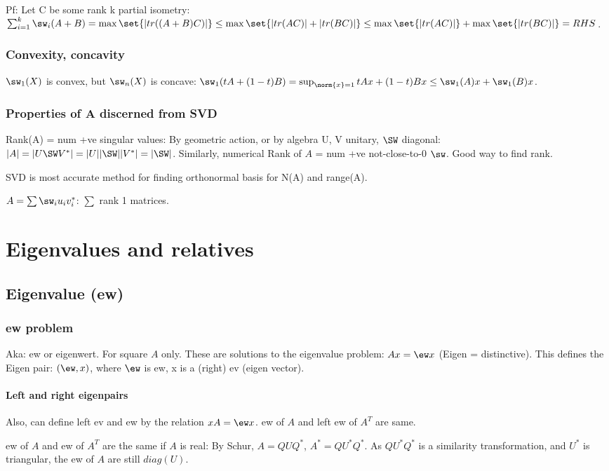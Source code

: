 \documentclass[oneside, article]{memoir}
\begin{document}
Pf: Let C be some rank k partial isometry:\\ $\sum_{i=1}^{k}\sw_{i}(A+B) = \max \set{|tr((A+B)C)|} \leq \max \set{|tr(AC)| + |tr(BC)|} \\
\leq \max \set{|tr(AC)|} + \max \set{|tr(BC)|} = RHS$.

\subsection{Convexity, concavity}
$\sw_1(X)$ is convex, but $\sw_n(X)$ is concave: $ \sw_1(tA + (1-t)B) = \sup_{\norm{x}=1} tAx + (1-t)Bx \leq \sw_1(A)x + \sw_1(B)x$.


\subsection{Properties of A discerned from SVD}
Rank(A) = num +ve singular values: By geometric action, or by algebra U, V unitary, $\SW$ diagonal: $|A|=|U\SW V^{*}|=|U||\SW| |V^{*}| =|\SW|$. Similarly, numerical Rank of $A$ = num +ve not-close-to-0 $\sw$. Good way to find rank.

SVD is most accurate method for finding orthonormal basis for N(A) and range(A).

$A=\sum \sw_{i}u_{i}v_{i}^{*}$: $\sum$ rank 1 matrices.

\chapter{Eigenvalues and relatives}
\section{Eigenvalue (ew)}
\subsection{ew problem}
Aka: ew or eigenwert. For square $A$ only. These are solutions to the eigenvalue problem: $Ax=\ew x$ (Eigen = distinctive). This defines the Eigen pair: $(\ew, x)$, where $\ew$ is ew, x is a (right) ev (eigen vector).

\subsubsection{Left and right eigenpairs}
Also, can define left ev and ew by the relation $xA = \ew x$. ew of $A$ and left ew of $A^{T}$ are same.

ew of $A$ and ew of $A^{T}$ are the same if $A$ is real: By Schur, $A=QUQ^{*}$, $A^{*}=QU^{*}Q^{*}$. As  $QU^{*}Q^{*}$ is a similarity transformation, and $U^*$ is triangular, the ew of $A$ are still $diag(U)$.
\end{document}
